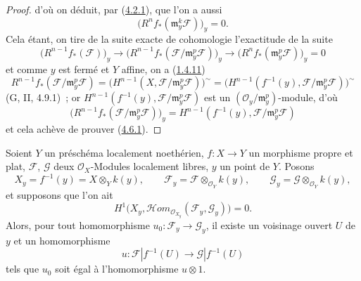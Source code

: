 \begin{proof}
d'où on déduit, par (\hyperref[III.4.2.1-fr]{4.2.1}), que l'on a aussi
\[
\label{III.4.6.1.4-fr}
\bigl(R^nf_*(\mathfrak m_y^k\mathcal F)\bigr)_y=0.
\tag{4.6.1.4}
\]
Cela étant, on tire de la suite exacte de cohomologie l'exactitude de la
suite
\[
\bigl(R^{n-1}f_*(\mathcal F)\bigr)_y
\longrightarrow
\bigl(R^{n-1}f_*(\mathcal F/\mathfrak m_y^p\mathcal F)\bigr)_y
\longrightarrow
\bigl(R^nf_*(\mathfrak m_y^p\mathcal F)\bigr)_y=0
\]
et comme $y$ est fermé et $Y$ affine, on a (\hyperref[III.1.4.11-fr]{1.4.11})
\[
R^{n-1}f_*(\mathcal F/\mathfrak m_y^p\mathcal F)
=\bigl(H^{n-1}(X,\mathcal F/\mathfrak m_y^p\mathcal F)\bigr)^\sim
=\bigl(H^{n-1}(f^{-1}(y),
\mathcal F/\mathfrak m_y^p\mathcal F)\bigr)^\sim
\]
(G, II, 4.9.1)~; or
$H^{n-1}(f^{-1}(y),\mathcal F/\mathfrak m_y^p\mathcal F)$ est un
$(\mathcal O_y/\mathfrak m_y^p)$-module, d'où
\[
\bigl(R^{n-1}f_*(\mathcal F/\mathfrak m_y^p\mathcal F)\bigr)_y
=H^{n-1}(f^{-1}(y),\mathcal F/\mathfrak m_y^p\mathcal F)
\]
et cela achève de prouver (\hyperref[III.4.6.1-fr]{4.6.1}).
\end{proof}

\begin{corollary}[4.6.2]
\label{III.4.6.2-fr}
Soient $Y$ un préschéma localement noethérien, $f:X\to Y$ un morphisme propre
et plat, $\mathcal F$, $\mathcal G$ deux $\mathcal O_X$-Modules localement
libres, $y$ un point de $Y$. Posons
\[
X_y=f^{-1}(y)=X\otimes_Yk(y),\qquad
\mathcal F_y=\mathcal F\otimes_{\mathcal O_Y}k(y),\qquad
\mathcal G_y=\mathcal G\otimes_{\mathcal O_Y}k(y),
\]
et supposons que l'on ait
\[
\label{III.4.6.2.1-fr}
H^1\bigl(X_y,
\mathcal{H}\!om_{\mathcal O_{X_y}}(\mathcal F_y,\mathcal G_y)\bigr)=0.
\tag{4.6.2.1}
\]
Alors, pour tout homomorphisme $u_0:\mathcal F_y\to\mathcal G_y$, il existe
un voisinage ouvert $U$ de $y$ et un homomorphisme
\[
u:\mathcal F|f^{-1}(U)\longrightarrow\mathcal G|f^{-1}(U)
\]
tels que $u_0$ soit égal à l'homomorphisme $u\otimes1$.
\end{corollary}

